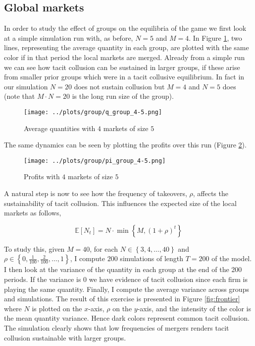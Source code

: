 \documentclass[american]{scrartcl}
\newcommand{\set}[1]{\left\{#1\right\}}
\newcommand{\E}{\mathbb{E}}
\begin{document}
\subsection{Global markets}

In order to study the effect of groups on the equilibria of the game we first look at a simple simulation run with, as before, $N = 5$ and $M = 4$. In Figure \ref{fig:small_avg}, two lines, representing the average quantity in each group, are plotted with the same color if in that period the local markets are merged. Already from a simple run we can see how tacit collusion can be sustained in larger groups, if these arise from smaller prior groups which were in a tacit collusive equilibrium. In fact in our simulation $N = 20$ does not sustain collusion but $M = 4$ and $N = 5$ does (note that $M\cdot N = 20$ is the long run size of the group).

\begin{figure}[H]
    \center
    \texttt{[image: ../plots/group/q\_group\_4-5.png]}
    \caption{Average quantities with $4$ markets of size $5$}
    \label{fig:small_avg}
\end{figure}

The same dynamics can be seen by plotting the profits over this run (Figure \ref{fig:small_avg_profit}).

\begin{figure}[H]
    \center
    \texttt{[image: ../plots/group/pi\_group\_4-5.png]}
    \caption{Profits with $4$ markets of size $5$}
    \label{fig:small_avg_profit}
\end{figure}

A natural step is now to see how the frequency of takeovers, $\rho$, affects the sustainability of tacit collusion. This influences the expected size of the local markets as follows,

\begin{equation}
    \E[N_t] = N \cdot \min\left\{M, (1 + \rho)^t \right\}
\end{equation}

To study this, given $M = 40$, for each $N \in \set{3, 4, \ldots, 40}$ and $\rho \in \set{0, \frac{1}{100},\frac{2}{100}, \ldots, 1}$, I compute $200$ simulations of length $T = 200$ of the model. I then look at the variance of the quantity in each group at the end of the 200 periods. If the variance is 0 we have evidence of tacit collusion since each firm is playing the same quantity. Finally, I compute the average variance across groups and simulations. The result of this exercise is presented in Figure \ref{fig:frontier} where $N$ is plotted on the $x$-axis, $\rho$ on the $y$-axis, and the intensity of the color is the mean quantity variance. Hence dark colors represent common tacit collusion. The simulation clearly shows that low frequencies of mergers renders tacit collusion sustainable with larger groups.
\end{document}
